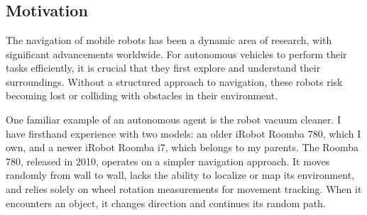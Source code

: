 \chapter{\bevezetes}

\section{Motivation}

The navigation of mobile robots has been a dynamic area of research, with significant advancements worldwide. For autonomous vehicles to perform their tasks efficiently, it is crucial that they first explore and understand their surroundings. Without a structured approach to navigation, these robots risk becoming lost or colliding with obstacles in their environment.

One familiar example of an autonomous agent is the robot vacuum cleaner. I have firsthand experience with two models: an older iRobot Roomba 780, which I own, and a newer iRobot Roomba i7, which belongs to my parents. The Roomba 780, released in 2010, operates on a simpler navigation approach. It moves randomly from wall to wall, lacks the ability to localize or map its environment, and relies solely on wheel rotation measurements for movement tracking. When it encounters an object, it changes direction and continues its random path.

